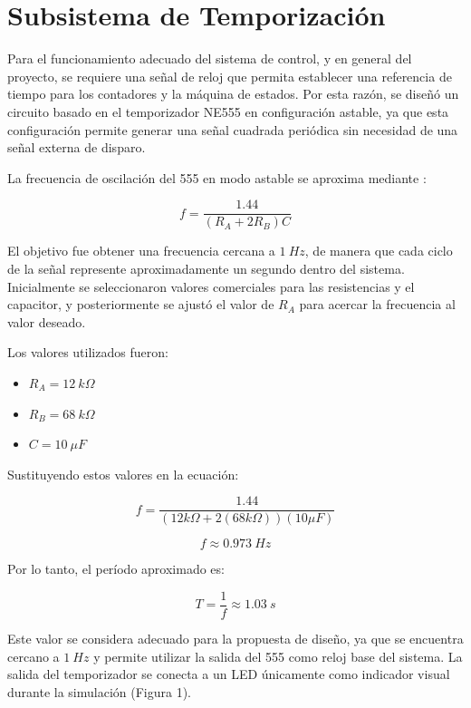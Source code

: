 \documentclass[12pt,onecolumn]{IEEEtran}
\begin{document}
\section{Subsistema de Temporización}

Para el funcionamiento adecuado del sistema de control, y en general del proyecto, se requiere una señal de reloj que permita establecer una referencia de tiempo para los contadores y la máquina de estados. Por esta razón, se diseñó un circuito basado en el temporizador NE555 en configuración astable, ya que esta configuración permite generar una señal cuadrada periódica sin necesidad de una señal externa de disparo.

La frecuencia de oscilación del 555 en modo astable se aproxima mediante \cite{electronicafp}:

\begin{equation}
	\label{eq:NE555}
    f = \frac{1.44}{(R_A + 2R_B)C}
\end{equation}

El objetivo fue obtener una frecuencia cercana a $1~Hz$, de manera que cada ciclo de la señal represente aproximadamente un segundo dentro del sistema. Inicialmente se seleccionaron valores comerciales para las resistencias y el capacitor, y posteriormente se ajustó el valor de $R_A$ para acercar la frecuencia al valor deseado.

Los valores utilizados fueron:

\begin{itemize}
    \item $R_A = 12~k\Omega$
    \item $R_B = 68~k\Omega$
    \item $C = 10~\mu F$
\end{itemize}

Sustituyendo estos valores en la ecuación:

\begin{equation}
    f = \frac{1.44}{(12k\Omega + 2(68k\Omega))(10\mu F)}
\end{equation}

\begin{equation}
    f \approx 0.973~Hz
\end{equation}

Por lo tanto, el período aproximado es:

\begin{equation}
    T = \frac{1}{f} \approx 1.03~s
\end{equation}

Este valor se considera adecuado para la propuesta de diseño, ya que se encuentra cercano a $1~Hz$ y permite utilizar la salida del 555 como reloj base del sistema. La salida del temporizador se conecta a un LED únicamente como indicador visual durante la simulación (Figura 1).
\end{document}
